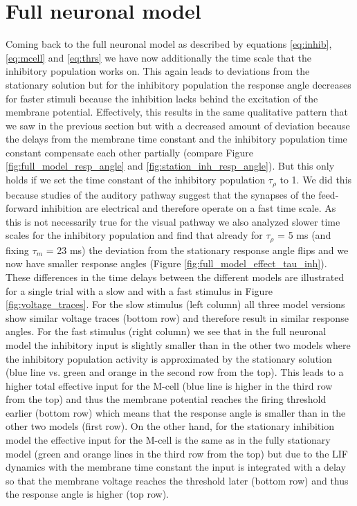 \documentclass[a4paper,10pt,hidelinks]{scrreprt}
\begin{document}
    \section{Full neuronal model}
    Coming back to the full neuronal model as described by equations \ref{eq:inhib}, \ref{eq:mcell} and \ref{eq:thrs} we have now additionally the time scale that the inhibitory population works on.
    This again leads to deviations from the stationary solution but for the inhibitory population the response angle decreases for faster stimuli because the inhibition lacks behind the excitation of the membrane potential.
    Effectively, this results in the same qualitative pattern that we saw in the previous section but with a decreased amount of deviation because the delays from the membrane time constant and the inhibitory population time constant compensate each other partially (compare Figure \ref{fig:full_model_resp_angle} and \ref{fig:station_inh_resp_angle}).
    But this only holds if we set the time constant of the inhibitory population $\tau_{\rho}$ to 1.
    We did this because studies of the auditory pathway suggest that the synapses of the feed-forward inhibition are electrical and therefore operate on a fast time scale.
    As this is not necessarily true for the visual pathway we also analyzed slower time scales for the inhibitory population and find that already for $\tau_{\rho}$ = 5 ms (and fixing $\tau_m$ = 23 ms) the deviation from the stationary response angle flips and we now have smaller response angles (Figure \ref{fig:full_model_effect_tau_inh}).\\
    These differences in the time delays between the different models are illustrated for a single trial with a slow and with a fast stimulus in Figure \ref{fig:voltage_traces}.
    For the slow stimulus (left column) all three model versions show similar voltage traces (bottom row) and therefore result in similar response angles.
    For the fast stimulus (right column) we see that in the full neuronal model the inhibitory input is slightly smaller than in the other two models where the inhibitory population activity is approximated by the stationary solution (blue line vs. green and orange in the second row from the top).
    This leads to a higher total effective input for the M-cell (blue line is higher in the third row from the top) and thus the membrane potential reaches the firing threshold earlier (bottom row) which means that the response angle is smaller than in the other two models (first row).
    On the other hand, for the stationary inhibition model the effective input for the M-cell is the same as in the fully stationary model (green and orange lines in the third row from the top) but due to the LIF dynamics with the membrane time constant the input is integrated with a delay so that the membrane voltage reaches the threshold later (bottom row) and thus the response angle is higher (top row).
\end{document}
